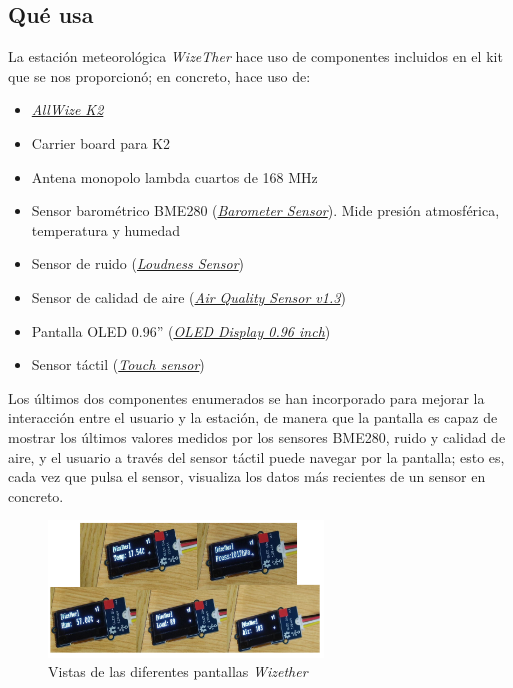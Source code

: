 \documentclass[12pt]{article}
\begin{document}
\subsection{Qué usa}

La estación meteorológica \textit{WizeTher} hace uso de componentes incluidos en el kit que se nos proporcionó; en concreto, hace uso de:

\begin{itemize}
	\item \href{https://www.allwize.io/product-page/the-allwize-k2}{\textit{AllWize K2}}
	\item Carrier board para K2
	\item Antena monopolo lambda cuartos de 168 MHz
	\item Sensor barométrico BME280 (\href{https://wiki.seeedstudio.com/Grove-Barometer_Sensor-BME280/}{\textit{Barometer Sensor}}). Mide presión atmosférica, temperatura y humedad
	\item Sensor de ruido (\href{https://wiki.seeedstudio.com/Grove-Loudness_Sensor/}{\textit{Loudness Sensor}})
	\item Sensor de calidad de aire (\href{https://wiki.seeedstudio.com/Grove-Air_Quality_Sensor_v1.3/}{\textit{Air Quality Sensor v1.3}})
	\item Pantalla OLED 0.96'' (\href{https://wiki.seeedstudio.com/Grove-OLED_Display_0.96inch/}{\textit{OLED Display 0.96 inch}})
	\item Sensor táctil (\href{https://wiki.seeedstudio.com/Grove-Touch_Sensor/}{\textit{Touch sensor}})
\end{itemize}

\noindent Los últimos dos componentes enumerados se han incorporado para mejorar la interacción entre el usuario y la estación, de manera que la pantalla es capaz de mostrar los últimos valores medidos por los sensores BME280, ruido y calidad de aire, y el usuario a través del sensor táctil puede navegar por la pantalla; esto es, cada vez que pulsa el sensor, visualiza los datos más recientes de un sensor en concreto. \\

\begin{figure}[h]
	\begin{center}
		\includegraphics[width=0.65\textwidth]{img/Display_Wizether.png}
		\caption{Vistas de las diferentes pantallas \textit{Wizether}}
	\end{center}
\end{figure}
\end{document}

